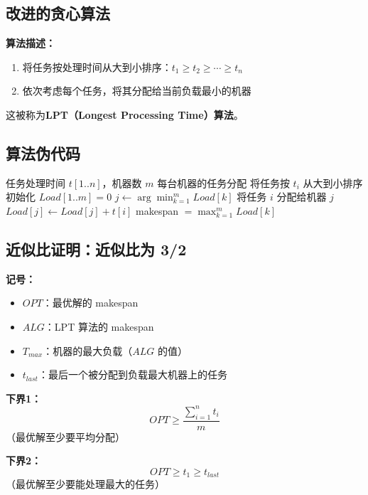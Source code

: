 \documentclass[UTF8,12pt,a4paper]{ctexart}
\begin{document}
\subsection*{改进的贪心算法}

\textbf{算法描述：}
\begin{enumerate}
	\item 将任务按处理时间从大到小排序：$t_1 \geq t_2 \geq \cdots \geq t_n$
	\item 依次考虑每个任务，将其分配给当前负载最小的机器
\end{enumerate}

这被称为\textbf{LPT（Longest Processing Time）算法}。

\subsection*{算法伪代码}

\begin{algorithm}[H]
	\caption{LPT 调度算法}
	\begin{algorithmic}[1]
		\Require 任务处理时间 $t[1..n]$，机器数 $m$
		\Ensure 每台机器的任务分配
		\State 将任务按 $t_i$ 从大到小排序
		\State 初始化 $Load[1..m] = 0$ 
			\State $j \gets \arg\min_{k=1}^{m} Load[k]$ 
			\State 将任务 $i$ 分配给机器 $j$
			\State $Load[j] \gets Load[j] + t[i]$
		\EndFor
		\State \Return makespan $= \max_{k=1}^{m} Load[k]$
	\end{algorithmic}
\end{algorithm}

\subsection*{近似比证明：近似比为 3/2}

\textbf{记号：}
\begin{itemize}
	\item $OPT$：最优解的 makespan
	\item $ALG$：LPT 算法的 makespan
	\item $T_{max}$：机器的最大负载（$ALG$ 的值）
	\item $t_{last}$：最后一个被分配到负载最大机器上的任务
\end{itemize}

\textbf{下界1：}
$$OPT \geq \frac{\sum_{i=1}^{n} t_i}{m}$$
（最优解至少要平均分配）

\textbf{下界2：}
$$OPT \geq t_1 \geq t_{last}$$
（最优解至少要能处理最大的任务）
\end{document}
